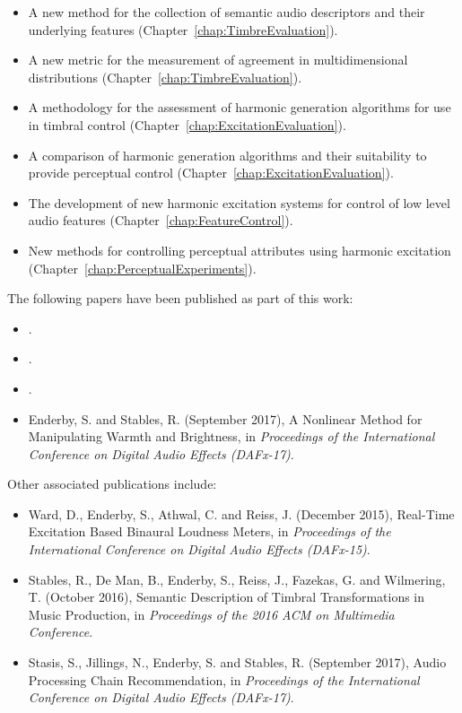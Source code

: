 	\begin{itemize}
		\item A new method for the collection of semantic audio descriptors and their underlying features
		      (Chapter~\ref{chap:TimbreEvaluation}).
		\item A new metric for the measurement of agreement in multidimensional distributions
		      (Chapter~\ref{chap:TimbreEvaluation}).
		\item A methodology for the assessment of harmonic generation algorithms for use in timbral control
		      (Chapter~\ref{chap:ExcitationEvaluation}).
		\item A comparison of harmonic generation algorithms and their suitability to provide perceptual control
		      (Chapter~\ref{chap:ExcitationEvaluation}).
		\item The development of new harmonic excitation systems for control of low level audio features
		      (Chapter~\ref{chap:FeatureControl}).
		\item New methods for controlling perceptual attributes using harmonic excitation
		      (Chapter~\ref{chap:PerceptualExperiments}).
	\end{itemize}

	The following papers have been published as part of this work:

	\begin{itemize}
		\item {}.
		\item {}.
		\item {}.
		\item Enderby, S. and Stables, R. (September 2017), A Nonlinear Method for Manipulating Warmth and
		      Brightness, in \emph{Proceedings of the International Conference on Digital Audio Effects (DAFx-17)}.
	\end{itemize}

	Other associated publications include:

	\begin{itemize}
		\item Ward, D., Enderby, S., Athwal, C. and Reiss, J. (December 2015), Real-Time Excitation Based Binaural
		      Loudness Meters, in \emph{Proceedings of the International Conference on Digital Audio Effects
		      (DAFx-15)}.
		\item Stables, R., De Man, B., Enderby, S., Reiss, J., Fazekas, G. and Wilmering, T. (October 2016),
		      Semantic Description of Timbral Transformations in Music Production, in \emph{Proceedings of the
		      2016 ACM on Multimedia Conference}.
		\item Stasis, S., Jillings, N., Enderby, S. and Stables, R. (September 2017), Audio Processing Chain
		      Recommendation, in \emph{Proceedings of the International Conference on Digital Audio Effects
		      (DAFx-17)}.
	\end{itemize}
